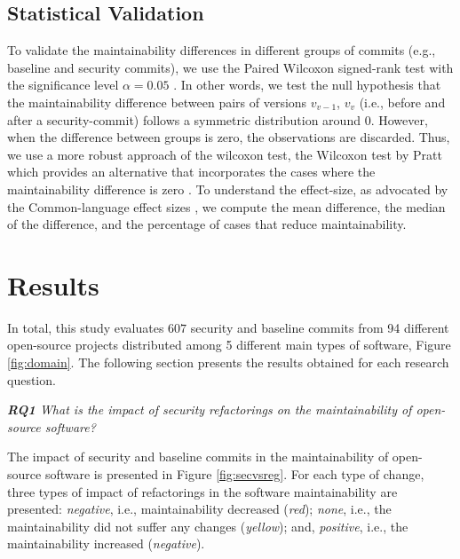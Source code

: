 \documentclass[10pt,conference]{IEEEtran}
\begin{document}
\subsection{Statistical Validation}\label{sec:statsval}
%
To validate the maintainability differences in different groups of commits
(e.g., baseline and security commits), we use the Paired Wilcoxon signed-rank
test with the significance level $\alpha = 0.05$ \cite{10.2307/3001968} . In
other words, we test the null hypothesis that the maintainability difference
between pairs of versions $v_{v-1}$, $v_v$ (i.e., before and after a
security-commit) follows a symmetric distribution around $0$. However, when the
difference between groups is zero, the observations are discarded. Thus, we use
a more robust approach of the wilcoxon test, the Wilcoxon test by Pratt which
provides an alternative that incorporates the cases where the maintainability
difference is zero \cite{10.2307/2282543}. To understand the effect-size, as
advocated by the Common-language effect sizes \cite{graw:1992}, we compute the
mean difference, the median of the difference, and the percentage of cases that
reduce maintainability.


%
\section{Results}\label{sec:results}

In total, this study evaluates $607$ security and baseline commits from 94 different open-source projects distributed among 5 different main types of software, Figure \ref{fig:domain}. The following section presents the results obtained for each research question.

\begin{framed}
\textit{\textbf{RQ1} What is the impact of security refactorings on the maintainability of open-source software?}
\end{framed}

The impact of security and baseline commits in the maintainability of open-source software is presented in Figure \ref{fig:secvsreg}. For each type of change, three types of impact of refactorings in the software maintainability are presented: \emph{negative}, i.e., maintainability decreased (\emph{red}); \emph{none}, i.e., the maintainability did not suffer any changes (\emph{yellow}); and, \emph{positive}, i.e., the maintainability increased (\emph{negative}). 
\end{document}
